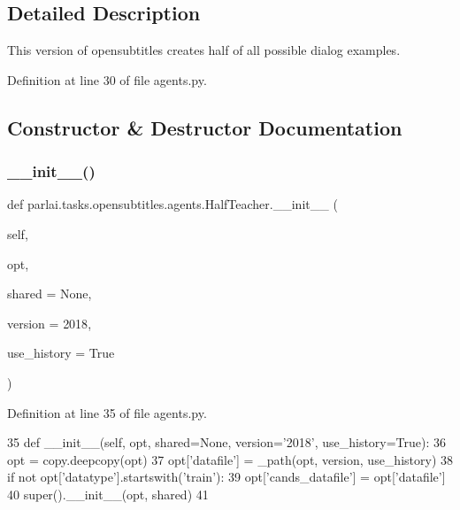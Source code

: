 \subsection{Detailed Description}
\begin{DoxyVerb}This version of opensubtitles creates half of all possible dialog examples.
\end{DoxyVerb}
 

Definition at line 30 of file agents.\+py.



\subsection{Constructor \& Destructor Documentation}
\mbox{\label{classparlai_1_1tasks_1_1opensubtitles_1_1agents_1_1HalfTeacher_aea4e464ad2d0ac4af96d426b171324bc}} 
\subsubsection{\texorpdfstring{\+\_\+\+\_\+init\+\_\+\+\_\+()}{\_\_init\_\_()}}
{\footnotesize\ttfamily def parlai.\+tasks.\+opensubtitles.\+agents.\+Half\+Teacher.\+\_\+\+\_\+init\+\_\+\+\_\+ (\begin{DoxyParamCaption}\item[{}]{self,  }\item[{}]{opt,  }\item[{}]{shared = {\ttfamily None},  }\item[{}]{version = {\ttfamily \textquotesingle{}2018\textquotesingle{}},  }\item[{}]{use\+\_\+history = {\ttfamily True} }\end{DoxyParamCaption})}



Definition at line 35 of file agents.\+py.


\begin{DoxyCode}
35     \textcolor{keyword}{def }\_\_init\_\_(self, opt, shared=None, version='2018', use\_history=True):
36         opt = copy.deepcopy(opt)
37         opt[\textcolor{stringliteral}{'datafile'}] = \_path(opt, version, use\_history)
38         \textcolor{keywordflow}{if} \textcolor{keywordflow}{not} opt[\textcolor{stringliteral}{'datatype'}].startswith(\textcolor{stringliteral}{'train'}):
39             opt[\textcolor{stringliteral}{'cands\_datafile'}] = opt[\textcolor{stringliteral}{'datafile'}]
40         super().\_\_init\_\_(opt, shared)
41 
\end{DoxyCode}


